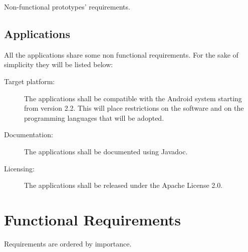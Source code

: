 Non-functional prototypes' requirements.


\subsection{Applications}

All the applications share some non functional requirements.
For the sake of simplicity they will be listed below:

\begin{description}
	\item[Target platform:] The applications shall be compatible with the Android
	system starting from version 2.2. This will place restrictions on the software
	and on the programming languages that will be adopted.
	\item[Documentation:] The applications shall be documented using Javadoc.
	\item[Licensing:] The applications shall be released under the Apache License 2.0.
\end{description}

\newpage

\section{Functional Requirements}


Requirements are ordered by importance.

